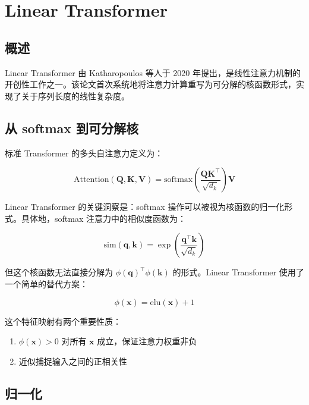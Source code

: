 \chapter{Linear Transformer}

\section{概述}

Linear Transformer 由 Katharopoulos 等人于 2020 年提出，是线性注意力机制的开创性工作之一。该论文首次系统地将注意力计算重写为可分解的核函数形式，实现了关于序列长度的线性复杂度。

\section{从 softmax 到可分解核}

标准 Transformer 的多头自注意力定义为：

\begin{equation}
    \text{Attention}(\mathbf{Q}, \mathbf{K}, \mathbf{V}) = \text{softmax}\left(\frac{\mathbf{Q}\mathbf{K}^\top}{\sqrt{d_k}}\right)\mathbf{V}
\end{equation}

Linear Transformer 的关键洞察是：softmax 操作可以被视为核函数的归一化形式。具体地，softmax 注意力中的相似度函数为：

\begin{equation}
    \text{sim}(\mathbf{q}, \mathbf{k}) = \exp\left(\frac{\mathbf{q}^\top \mathbf{k}}{\sqrt{d_k}}\right)
\end{equation}

但这个核函数无法直接分解为 $\phi(\mathbf{q})^\top \phi(\mathbf{k})$ 的形式。Linear Transformer 使用了一个简单的替代方案：

\begin{equation}
    \phi(\mathbf{x}) = \text{elu}(\mathbf{x}) + 1
\end{equation}

这个特征映射有两个重要性质：

\begin{enumerate}
    \item $\phi(\mathbf{x}) > 0$ 对所有 $\mathbf{x}$ 成立，保证注意力权重非负
    \item 近似捕捉输入之间的正相关性
\end{enumerate}

\section{归一化}


